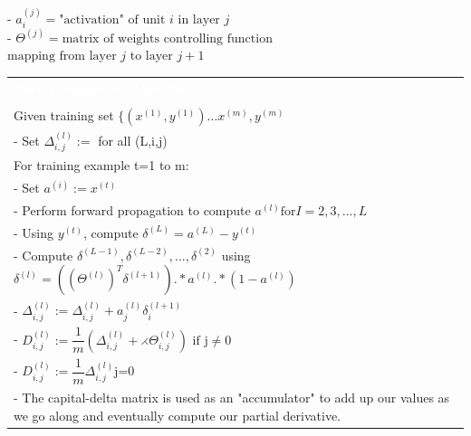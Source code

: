\documentclass[a4paper,12pt,ngerman,fleqn]{article}
\newcommand{\mybox}[3]{
        \centering
        \begin{tabularx}{0.9\textwidth}{|X|}
            \rowcolor{accent}
            \rule{0pt}{20pt}
            \textcolor{white}{\textbf{#1}} \\
            \def\temp{#2}\ifx\temp\empty
                
            \else
                #2 \\ \hline
            \fi
            #3
            \\ \hline
        \end{tabularx}
    }
\begin{document}
\begin{minipage}[t]{.51\textwidth}
{            }
            {
                - \(a_i^{(j)} = \text{"activation" of unit $i$ in layer $j$} \) \\
                - \(\Theta^{(j)} = \text{matrix of weights controlling function} \) \\
                \( \text{mapping from layer $j$ to layer $j+1$} \)
            }
        \newline
    \end{minipage}%
    \begin{minipage}[t]{.51\textwidth}
        \vspace{1pt}
        \mybox
            {Back propagation Algorithm}
            {}
            {
                Given training set \( \{ (x^{(1)}, y^{(1)}) ... x^{(m)}, y^{(m)} \) \\
                - Set \( \Delta^{(l)}_{i,j} := \) for all (L,i,j) \\
                For training example t=1 to m: \\
                - Set \( a^{(i)} := x^{(t)}\) \\
                - Perform forward propagation to compute \( a^{(l)} \text{for} I=2,3,...,L \) \\
                - Using \( y^{(t)} \), compute \( \delta^{(L)} = a^{(L)} - y^{(t)} \) \\
                - Compute \( \delta^{(L-1)},\delta^{(L-2)},...,\delta^{(2)} \) using \( \delta^{(l)} = ((\Theta^{(l)})^T \delta^{(l+1)}). * a^{(l)}. * (1-a^{(l)})\) \\
                - \( \Delta^{(l)}_{i,j} := \Delta^{(l)}_{i,j} + a^{(l)}_j\delta^{(l+1)}_i\) \\
                - \( D^{(l)}_{i,j} := \dfrac{1}{m} (\Delta^{(l)}_{i,j} + \rightthreetimes\Theta^{(l)}_{i,j}) \text{ if j} \neq 0\) \\
                - \( D^{(l)}_{i,j} := \dfrac{1}{m} \Delta^{(l)}_{i,j} \text{j=0} \) \\
                - The capital-delta matrix is used as an "accumulator" to add up our values as we go along and eventually compute our partial derivative.
            }
        \newline
    \end{minipage}

    \vspace{125.5pt}
    
\end{document}
